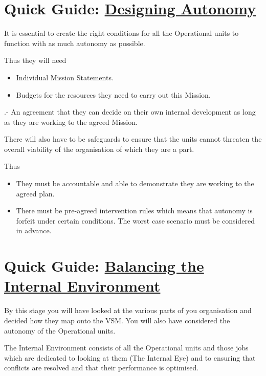 \section*{Quick Guide: \href{https://vsmg.lrc.org.uk/screen.php?page=4autonomy}{Designing Autonomy}}
It is essential to create the right conditions for all the Operational units to function with as much autonomy as possible.

Thus they will need

\begin{itemize}
  \item Individual Mission Statements.

  \item Budgets for the resources they need to carry out this Mission.

\end{itemize}

.-   An agreement that they can decide on their own internal development as long as they are working to the agreed Mission.

There will also have to be safeguards to ensure that the units cannot threaten the overall viability of the organisation of which they are a part.

Thus

\begin{itemize}
  \item They must be accountable and able to demonstrate they are working to the agreed plan.

  \item There must be pre-agreed intervention rules which means that autonomy is forfeit under certain conditions. The worst case scenario must be considered in advance.

\end{itemize}

\section*{Quick Guide: \href{https://vsmg.lrc.org.uk/5intbal.html}{Balancing the Internal Environment}}
By this stage you will have looked at the various parts of you organisation and decided how they map onto the VSM. You will also have considered the autonomy of the Operational units.

The Internal Environment consists of all the Operational units and those jobs which are dedicated to looking at them (The Internal Eye) and to ensuring that conflicts are resolved and that their performance is optimised.

